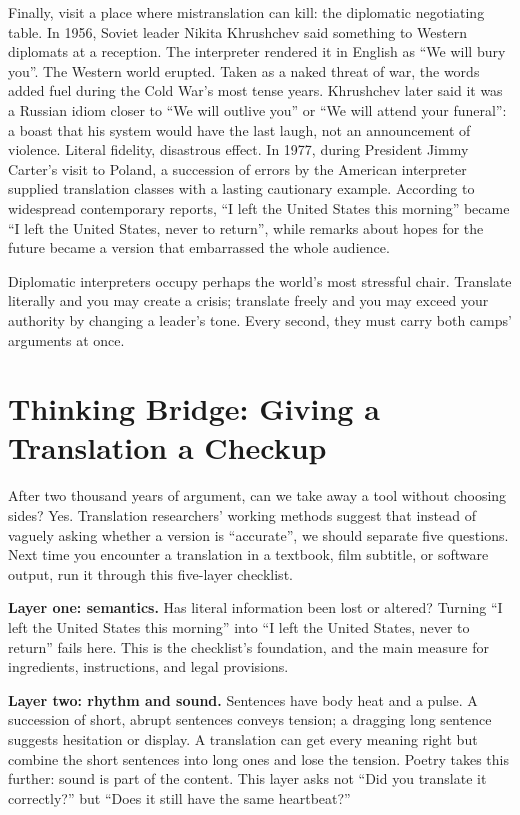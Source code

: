 Finally, visit a place where mistranslation can kill: the diplomatic negotiating table. In 1956, Soviet leader Nikita Khrushchev said something to Western diplomats at a reception. The interpreter rendered it in English as ``We will bury you''. The Western world erupted. Taken as a naked threat of war, the words added fuel during the Cold War's most tense years. Khrushchev later said it was a Russian idiom closer to ``We will outlive you'' or ``We will attend your funeral'': a boast that his system would have the last laugh, not an announcement of violence. Literal fidelity, disastrous effect. In 1977, during President Jimmy Carter's visit to Poland, a succession of errors by the American interpreter supplied translation classes with a lasting cautionary example. According to widespread contemporary reports, ``I left the United States this morning'' became ``I left the United States, never to return'', while remarks about hopes for the future became a version that embarrassed the whole audience.

Diplomatic interpreters occupy perhaps the world's most stressful chair. Translate literally and you may create a crisis; translate freely and you may exceed your authority by changing a leader's tone. Every second, they must carry both camps' arguments at once.

\section[Thinking Bridge: A Translation Checkup]{Thinking Bridge: Giving a Translation a Checkup}
After two thousand years of argument, can we take away a tool without choosing sides? Yes. Translation researchers' working methods suggest that instead of vaguely asking whether a version is ``accurate'', we should separate five questions. Next time you encounter a translation in a textbook, film subtitle, or software output, run it through this five-layer checklist.

\textbf{Layer one: semantics.} Has literal information been lost or altered? Turning ``I left the United States this morning'' into ``I left the United States, never to return'' fails here. This is the checklist's foundation, and the main measure for ingredients, instructions, and legal provisions.

\textbf{Layer two: rhythm and sound.} Sentences have body heat and a pulse. A succession of short, abrupt sentences conveys tension; a dragging long sentence suggests hesitation or display. A translation can get every meaning right but combine the short sentences into long ones and lose the tension. Poetry takes this further: sound is part of the content. This layer asks not ``Did you translate it correctly?'' but ``Does it still have the same heartbeat?''

